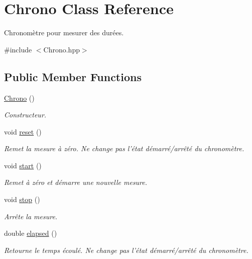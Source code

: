 \hypertarget{classChrono}{\section{Chrono Class Reference}
\label{classChrono}
}


Chronomètre pour mesurer des durées.  




{\ttfamily \#include $<$Chrono.\+hpp$>$}

\subsection*{Public Member Functions}
\begin{DoxyCompactItemize}
\item 
\hyperlink{classChrono_a3ac5e047174f389e7bd8aae71c6b5e8c}{Chrono} ()
\begin{DoxyCompactList}\small\item\em Constructeur. \end{DoxyCompactList}\item 
void \hyperlink{classChrono_a027be23720616639bc610a98c53740ea}{reset} ()
\begin{DoxyCompactList}\small\item\em Remet la mesure à zéro. Ne change pas l'état démarré/arrêté du chronomètre. \end{DoxyCompactList}\item 
void \hyperlink{classChrono_a25fa21b48125a6a811638aa6b8dcdbe8}{start} ()
\begin{DoxyCompactList}\small\item\em Remet à zéro et démarre une nouvelle mesure. \end{DoxyCompactList}\item 
void \hyperlink{classChrono_a7b8db2281381eac23da35a414077f3fd}{stop} ()
\begin{DoxyCompactList}\small\item\em Arrête la mesure. \end{DoxyCompactList}\item 
double \hyperlink{classChrono_aad4b00919a2eed1271259095a61b3096}{elapsed} ()
\begin{DoxyCompactList}\small\item\em Retourne le temps écoulé. Ne change pas l'état démarré/arrêté du chronomètre. \end{DoxyCompactList}\end{DoxyCompactItemize}


